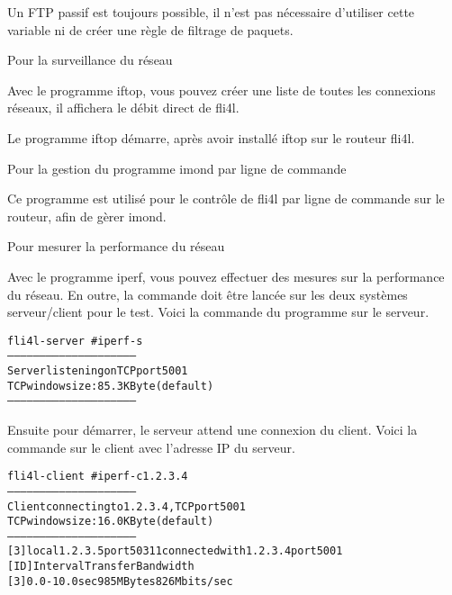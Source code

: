 \begin{description}
    Un FTP passif est toujours possible, il n'est pas nécessaire d'utiliser
    cette variable ni de créer une règle de filtrage de paquets.

 Pour la surveillance du réseau

    Avec le programme iftop, vous pouvez créer une liste de toutes les connexions
    réseaux, il affichera le débit direct de fli4l.

    Le programme iftop démarre, après avoir installé iftop sur le routeur fli4l.

 Pour la gestion du programme imond par ligne de commande

    Ce programme est utilisé pour le contrôle de fli4l par ligne de commande sur
    le routeur, afin de gèrer imond.

 Pour mesurer la performance du réseau

    Avec le programme iperf, vous pouvez effectuer des mesures sur la performance
    du réseau. En outre, la commande doit être lancée sur les deux systèmes
    serveur/client pour le test. Voici la commande du programme sur le serveur.

\begin{example}
\begin{alltt}
fli4l-server \version~\# iperf -s
------------------------------------------------------------
Server listening on TCP port 5001
TCP window size: 85.3 KByte (default)
------------------------------------------------------------
\end{alltt}
\end{example}

    Ensuite pour démarrer, le serveur attend une connexion du client. Voici
    la commande sur le client avec l'adresse IP du serveur.

\begin{example}
\begin{alltt}
fli4l-client \version~\# iperf -c 1.2.3.4
------------------------------------------------------------
Client connecting to 1.2.3.4, TCP port 5001
TCP window size: 16.0 KByte (default)
------------------------------------------------------------
[  3] local 1.2.3.5 port 50311 connected with 1.2.3.4 port 5001
[ ID] Interval       Transfer     Bandwidth
[  3]  0.0-10.0 sec    985 MBytes    826 Mbits/sec
\end{alltt}
\end{example}


\end{description}
